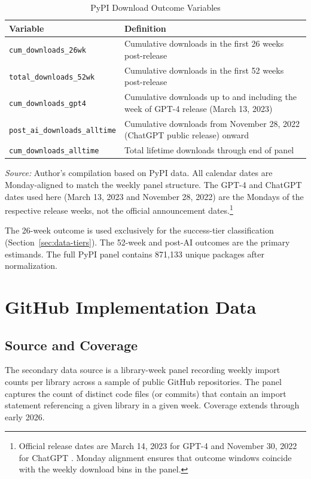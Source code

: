 \documentclass[12pt, a4paper]{report}
\begin{document}
\begin{table}[ht]
\centering
\caption{PyPI Download Outcome Variables}\label{tab:pypi-vars}
\small
\begin{tabular}{lp{10cm}}
\toprule
\textbf{Variable} & \textbf{Definition} \\ \midrule
\texttt{cum\_downloads\_26wk} & Cumulative downloads in the first 26 weeks post-release \\
\texttt{total\_downloads\_52wk} & Cumulative downloads in the first 52 weeks post-release \\
\texttt{cum\_downloads\_gpt4} & Cumulative downloads up to and including the week of GPT-4 release (March 13, 2023) \\
\texttt{post\_ai\_downloads\_alltime} & Cumulative downloads from November 28, 2022 (ChatGPT public release) onward \\
\texttt{cum\_downloads\_alltime} & Total lifetime downloads through end of panel \\ \bottomrule
\end{tabular}
\par\smallskip\noindent\textit{Source:} Author's compilation based on PyPI data. All calendar dates are Monday-aligned to match the weekly panel structure. The GPT-4 and ChatGPT dates used here (March 13, 2023 and November 28, 2022) are the Mondays of the respective release weeks, not the official announcement dates.\footnote{Official release dates are March 14, 2023 for GPT-4 \citep{openai2023gpt4} and November 30, 2022 for ChatGPT \citep{openai2022chatgpt}. Monday alignment ensures that outcome windows coincide with the weekly download bins in the panel.}
\end{table}

The 26-week outcome is used exclusively for the success-tier classification (Section~\ref{sec:data-tiers}). The 52-week and post-AI outcomes are the primary estimands. The full PyPI panel contains 871,133 unique packages after normalization.

\section{GitHub Implementation Data}\label{sec:data-github}
\subsection{Source and Coverage}
The secondary data source is a library-week panel recording weekly import counts per library across a sample of public GitHub repositories. The panel captures the count of distinct code files (or commits) that contain an import statement referencing a given library in a given week. Coverage extends through early 2026.
\end{document}
